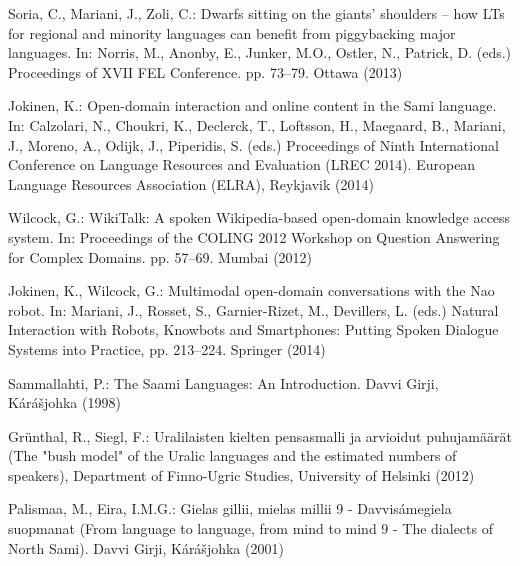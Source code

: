 \documentclass[runningheads,a4paper]{llncs}
\begin{document}


%

\begin{thebibliography}{10}
\providecommand{\url}[1]{\texttt{#1}}
\providecommand{\urlprefix}{URL }

Soria, C., Mariani, J., Zoli, C.: Dwarfs sitting on the giants' shoulders --
  how {LTs} for regional and minority languages can benefit from piggybacking
  major languages. In: Norris, M., Anonby, E., Junker, M.O., Ostler, N.,
  Patrick, D. (eds.) Proceedings of XVII FEL Conference. pp. 73--79. Ottawa
  (2013)

Jokinen, K.: Open-domain interaction and online content in the {Sami} language.
  In: Calzolari, N., Choukri, K., Declerck, T., Loftsson, H., Maegaard, B.,
  Mariani, J., Moreno, A., Odijk, J., Piperidis, S. (eds.) Proceedings of Ninth
  International Conference on Language Resources and Evaluation (LREC 2014).
  European Language Resources Association (ELRA), Reykjavik (2014)

Wilcock, G.: {WikiTalk}: A spoken {Wikipedia}-based open-domain knowledge
  access system. In: Proceedings of the COLING 2012 Workshop on Question
  Answering for Complex Domains. pp. 57--69. Mumbai (2012)

Jokinen, K., Wilcock, G.: Multimodal open-domain conversations with the {Nao}
  robot. In: Mariani, J., Rosset, S., Garnier-Rizet, M., Devillers, L. (eds.)
  Natural Interaction with Robots, Knowbots and Smartphones: Putting Spoken
  Dialogue Systems into Practice, pp. 213--224. Springer (2014)

Sammallahti, P.: The Saami Languages: An Introduction. {Davvi Girji},
  K\'{a}r\'{a}\v{s}johka (1998)

Gr\"unthal, R., Siegl, F.: Uralilaisten kielten pensasmalli ja arvioidut
  puhujam{\"a}{\"a}r{\"a}t ({The "bush model" of the Uralic languages and the
  estimated numbers of speakers}), {Department of Finno-Ugric Studies,
  University of Helsinki} (2012)

Palismaa, M., Eira, I.M.G.: {Gielas gillii, mielas millii 9 -
  Davvis\'{a}megiela suopmanat (From language to language, from mind to mind 9
  - The dialects of North Sami)}. {Davvi Girji}, K\'{a}r\'{a}\v{s}johka (2001)


\end{thebibliography}
\end{document}
